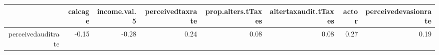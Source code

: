 \begin{table}[ht]
\centering
\begin{tabular}{rrrrrrrr}
  \hline
 & calcage & income.val.5 & perceivedtaxrate & prop.alters.tTaxes & altertaxaudit.tTaxes & actor & perceivedevasionrate \\ 
  \hline
perceivedauditrate & -0.15 & -0.28 & 0.24 & 0.08 & 0.08 & 0.27 & 0.19 \\ 
   \hline
\end{tabular}
\end{table}
